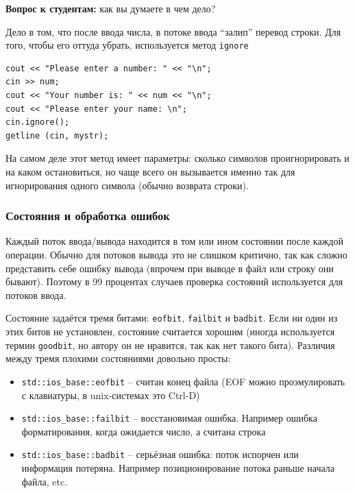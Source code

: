 \documentclass[a4paper,12pt,oneside]{article}
\newif\ifanswers
\begin{document}
\textbf{Вопрос к студентам:} как вы думаете в чем дело?

\ifanswers
Правильный ответ: см. ниже.
\fi

Дело в том, что после ввода числа, в потоке ввода ``залип'' перевод строки. Для того, чтобы его оттуда убрать, используется метод \lstinline!ignore!

\begin{lstlisting}
cout << "Please enter a number: " << "\n";
cin >> num;
cout << "Your number is: " << num << "\n";
cout << "Please enter your name: \n";
cin.ignore();
getline (cin, mystr);
\end{lstlisting}

На самом деле этот метод имеет параметры: сколько символов проигнорировать и на каком остановиться, но чаще всего он вызывается именно так для игнорирования одного символа (обычно возврата строки).

\subsubsection{Состояния и обработка ошибок}

Каждый поток ввода/вывода находится в том или ином состоянии после каждой операции. Обычно для потоков вывода это не слишком критично, так как сложно представить себе ошибку вывода (впрочем при выводе в файл или строку они бывают). Поэтому в 99 процентах случаев проверка состояний используется для потоков ввода.

Состояние задаётся тремя битами: \lstinline!eofbit!, \lstinline!failbit! и \lstinline!badbit!. Если ни один из этих битов не установлен, состояние считается хорошим (иногда используется термин \lstinline!goodbit!, но автору он не нравится, так как нет такого бита). Различия между тремя плохими состояниями довольно просты:

\begin{itemize}
\item \lstinline!std::ios_base::eofbit! -- считан конец файла (EOF можно проэмулировать с клавиатуры, в unix-системах это Ctrl-D)
\item \lstinline!std::ios_base::failbit! -- восстановимая ошибка. Например ошибка форматирования, когда ожидается число, а считана строка
\item \lstinline!std::ios_base::badbit! -- серьёзная ошибка: поток испорчен или информация потеряна. Например позиционирование потока раньше начала файла, etc.
\end{itemize}
\end{document}

